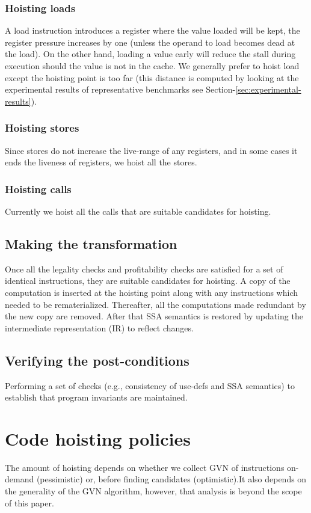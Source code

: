 \documentclass{sig-alternate}
\begin{document}
\subsubsection{Hoisting loads}
A load instruction introduces a register where the value loaded will be kept,
the register pressure increases by one (unless the operand to load becomes dead
at the load). On the other hand, loading a value early will reduce the stall
during execution should the value is not in the cache. We generally prefer to
hoist load except the hoisting point is too far (this distance is computed by
looking at the experimental results of representative benchmarks see
Section-\ref{sec:experimental-results}).

\subsubsection{Hoisting stores}
Since stores do not increase the live-range of any registers, and in some cases
it ends the liveness of registers, we hoist all the stores.

\subsubsection{Hoisting calls}
Currently we hoist all the calls that are suitable candidates for hoisting.

\subsection{Making the transformation}
Once all the legality checks and profitability checks are satisfied for a set of
identical instructions, they are suitable candidates for hoisting. A copy of the
computation is inserted at the hoisting point along with any instructions which
needed to be rematerialized. Thereafter, all the computations made redundant by
the new copy are removed. After that SSA semantics is restored by updating the
intermediate representation (IR) to reflect changes.

\subsection{Verifying the post-conditions}
Performing a set of checks (e.g., consistency of use-defs and SSA semantics) to
establish that program invariants are maintained.

\section{Code hoisting policies}
The amount of hoisting depends on whether we collect GVN of instructions
on-demand (pessimistic) or, before finding candidates (optimistic).It also
depends on the generality of the GVN algorithm, however, that analysis is beyond
the scope of this paper.
\end{document}
